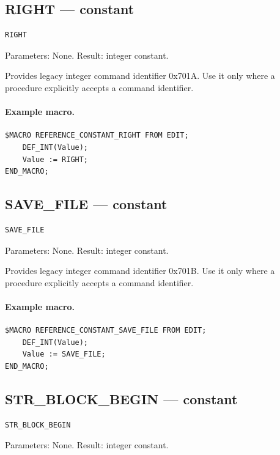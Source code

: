 \documentclass[a4paper,10pt,twoside,openany]{book}
\begin{document}
\label{prim:constant-right}
\subsection*{RIGHT --- constant}
\begin{verbatim}
RIGHT
\end{verbatim}
Parameters: None. Result: integer constant.

Provides legacy integer command identifier 0x701A. Use it only where a procedure explicitly accepts a command identifier.

\paragraph{Example macro.}
\begin{verbatim}
$MACRO REFERENCE_CONSTANT_RIGHT FROM EDIT;
    DEF_INT(Value);
    Value := RIGHT;
END_MACRO;
\end{verbatim}

\label{prim:constant-save-file}
\subsection*{SAVE\_FILE --- constant}
\begin{verbatim}
SAVE_FILE
\end{verbatim}
Parameters: None. Result: integer constant.

Provides legacy integer command identifier 0x701B. Use it only where a procedure explicitly accepts a command identifier.

\paragraph{Example macro.}
\begin{verbatim}
$MACRO REFERENCE_CONSTANT_SAVE_FILE FROM EDIT;
    DEF_INT(Value);
    Value := SAVE_FILE;
END_MACRO;
\end{verbatim}

\label{prim:constant-str-block-begin}
\subsection*{STR\_BLOCK\_BEGIN --- constant}
\begin{verbatim}
STR_BLOCK_BEGIN
\end{verbatim}
Parameters: None. Result: integer constant.
\end{document}
